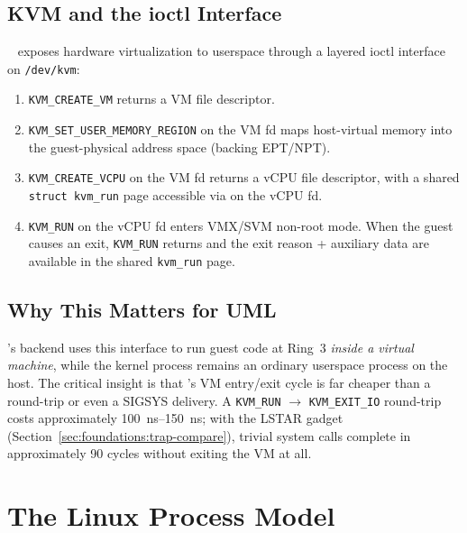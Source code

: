 \subsection{KVM and the ioctl Interface}

\KVM{}~\cite{kivity2007} exposes hardware virtualization to userspace
through a layered ioctl interface on \texttt{/dev/kvm}:

\begin{enumerate}
  \item \texttt{KVM\_CREATE\_VM} returns a VM file descriptor.
  \item \texttt{KVM\_SET\_USER\_MEMORY\_REGION} on the VM fd maps
        host-virtual memory into the guest-physical address space
        (backing EPT/NPT).
  \item \texttt{KVM\_CREATE\_VCPU} on the VM fd returns a vCPU file
        descriptor, with a shared \texttt{struct kvm\_run} page
        accessible via  on the vCPU fd.
  \item \texttt{KVM\_RUN} on the vCPU fd enters VMX/SVM non-root mode.
        When the guest causes an exit, \texttt{KVM\_RUN} returns and
        the exit reason + auxiliary data are available in the shared
        \texttt{kvm\_run} page.
\end{enumerate}

\subsection{Why This Matters for UML}

\UML{}'s \KVM{} backend uses this interface to run guest code at
Ring~3 \emph{inside a virtual machine}, while the \UML{} kernel
process remains an ordinary userspace process on the host.  The
critical insight is that \KVM{}'s VM entry/exit cycle is far cheaper
than a  round-trip or even a \Seccomp{} SIGSYS
delivery.  A \texttt{KVM\_RUN} $\rightarrow$ \texttt{KVM\_EXIT\_IO}
round-trip costs approximately \SIrange{100}{150}{\nano\second}; with
the LSTAR gadget (Section~\ref{sec:foundations:trap-compare}), trivial
system calls complete in approximately 90 cycles without exiting the
VM at all.


\section{The Linux Process Model}
\label{sec:foundations:process-model}

